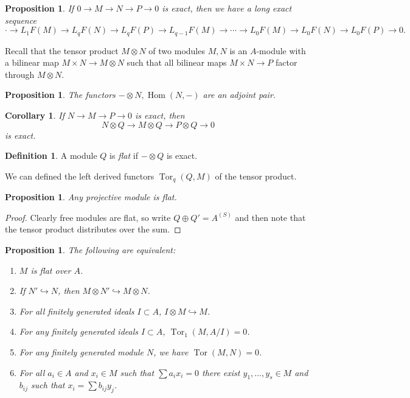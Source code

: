\documentclass[leqno, openany]{memoir}
\newtheorem{cor}[thm]{Corollary}
\newtheorem{prop}[thm]{Proposition}
\theoremstyle{definition}
\newtheorem{defn}[thm]{Definition}
\theoremstyle{remark}
\theoremstyle{plain}
\theoremstyle{definition}
\theoremstyle{remark}
\DeclareMathOperator{\Hom}{Hom}
\begin{document}
\begin{prop}
    If $0 \to M \to N \to P \to 0$ is exact, then we have a long exact sequence
    \[ \cdot \to L_1F(M) \to L_qF(N) \to L_q F(P) \to L_{q-1} F(M) \to \cdots \to L_0 F(M) \to L_0 F(N) \to L_0 F(P) \to 0. \]
\end{prop}
    
Recall that the tensor product $M \otimes N$ of two modules $M,N$ is an $A$-module with a bilinear map $M \times N \to M \otimes N$ such that all bilinear maps $M \times N \to P$ factor through $M \otimes N$.

\begin{prop}
    The functors $- \otimes N, \Hom(N,-)$ are an adjoint pair.
\end{prop}

\begin{cor}
    If $N \to M \to P \to 0$ is exact, then 
    \[ N \otimes Q \to M \otimes Q \to P \otimes Q \to 0 \]
    is exact.
\end{cor}

\begin{defn}
    A module $Q$ is \textit{flat} if $- \otimes Q$ is exact. 
\end{defn}

We can defined the left derived functors $\operatorname{Tor}_q(Q,M)$ of the tensor product.

\begin{prop}
    Any projective module is flat.
\end{prop}

\begin{proof}
    Clearly free modules are flat, so write $Q \oplus Q' = A^{(S)}$ and then note that the tensor product distributes over the sum.
\end{proof}

\begin{prop}
    The following are equivalent:
    \begin{enumerate}
        \item $M$ is flat over $A$.
        \item If $N' \hookrightarrow N$, then $M \otimes N' \hookrightarrow M \otimes N$.
        \item For all finitely generated ideals $I \subset A$, $I \otimes M \hookrightarrow M$.
        \item For any finitely generated ideals $I \subset A$, $\operatorname{Tor}_1(M,A/I) = 0$.
        \item For any finitely generated module $N$, we have $\operatorname{Tor}(M,N) = 0$.
        \item For all $a_i \in A$ and $x_i \in M$ such that $\sum a_i x_i = 0$ there exist $y_1, \ldots, y_s \in M$ and $b_{ij}$ such that $x_i = \sum b_{ij} y_j$.
    \end{enumerate}
\end{prop}
\end{document}
